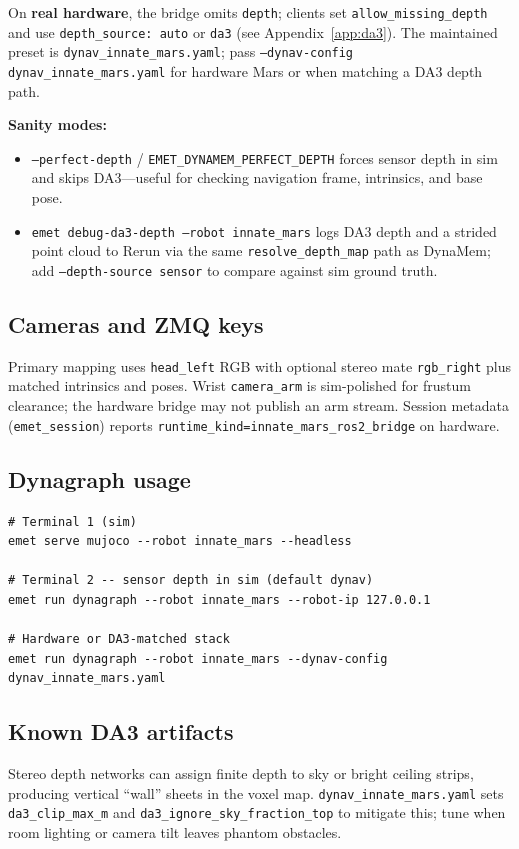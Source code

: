On \textbf{real hardware}, the bridge omits \texttt{depth}; clients set \texttt{allow\_missing\_depth} and use \texttt{depth\_source: auto} or \texttt{da3} (see Appendix~\ref{app:da3}).
The maintained preset is \texttt{dynav\_innate\_mars.yaml}; pass \texttt{--dynav-config dynav\_innate\_mars.yaml} for hardware Mars or when matching a DA3 depth path.

\textbf{Sanity modes:}
\begin{itemize}
  \item \texttt{--perfect-depth} / \texttt{EMET\_DYNAMEM\_PERFECT\_DEPTH} forces sensor depth in sim and skips DA3---useful for checking navigation frame, intrinsics, and base pose.
  \item \texttt{emet debug-da3-depth --robot innate\_mars} logs DA3 depth and a strided point cloud to Rerun via the same \texttt{resolve\_depth\_map} path as DynaMem; add \texttt{--depth-source sensor} to compare against sim ground truth.
\end{itemize}

\subsection{Cameras and ZMQ keys}

Primary mapping uses \texttt{head\_left} RGB with optional stereo mate \texttt{rgb\_right} plus matched intrinsics and poses.
Wrist \texttt{camera\_arm} is sim-polished for frustum clearance; the hardware bridge may not publish an arm stream.
Session metadata (\texttt{emet\_session}) reports \texttt{runtime\_kind=innate\_mars\_ros2\_bridge} on hardware.

\subsection{Dynagraph usage}

\begin{verbatim}
# Terminal 1 (sim)
emet serve mujoco --robot innate_mars --headless

# Terminal 2 -- sensor depth in sim (default dynav)
emet run dynagraph --robot innate_mars --robot-ip 127.0.0.1

# Hardware or DA3-matched stack
emet run dynagraph --robot innate_mars --dynav-config dynav_innate_mars.yaml
\end{verbatim}

\subsection{Known DA3 artifacts}

Stereo depth networks can assign finite depth to sky or bright ceiling strips, producing vertical ``wall'' sheets in the voxel map.
\texttt{dynav\_innate\_mars.yaml} sets \texttt{da3\_clip\_max\_m} and \texttt{da3\_ignore\_sky\_fraction\_top} to mitigate this; tune when room lighting or camera tilt leaves phantom obstacles.
